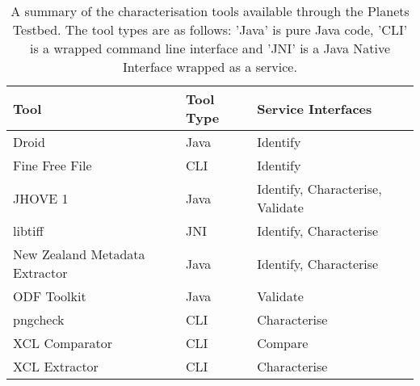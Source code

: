\documentclass{article}
\begin{document}
\begin{table}
\centering
\begin{tabular}{|l|l|l|}
  \hline
  Tool  & Tool Type & Service Interfaces \\
  \hline
  Droid & Java & Identify\\
  Fine Free File & CLI & Identify\\
  JHOVE 1 & Java & Identify, Characterise, Validate\\
  libtiff & JNI & Identify, Characterise\\
  New Zealand Metadata Extractor & Java & Identify, Characterise\\ 
  ODF Toolkit & Java & Validate\\
  pngcheck & CLI & Characterise \\
  XCL Comparator & CLI & Compare \\
  XCL Extractor & CLI & Characterise \\
  \hline
\end{tabular}
\caption{A summary of the characterisation tools available through the Planets Testbed. The tool types are as follows: 'Java' is pure Java code, 'CLI' is a wrapped command line interface and 'JNI' is a Java Native Interface wrapped as a service.}
\label{table-pc-s}
\end{table}
\end{document}
